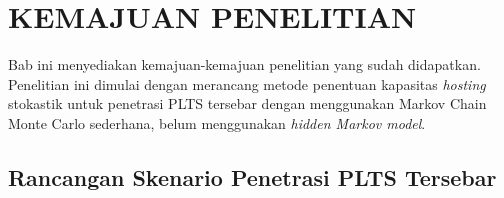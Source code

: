 \chapter{KEMAJUAN PENELITIAN}
Bab ini menyediakan kemajuan-kemajuan penelitian yang sudah didapatkan. Penelitian ini dimulai dengan merancang metode penentuan kapasitas \textit{hosting} stokastik untuk penetrasi PLTS tersebar dengan menggunakan Markov Chain Monte Carlo sederhana, belum menggunakan \textit{hidden Markov model}.

\section{Rancangan Skenario Penetrasi PLTS Tersebar}

